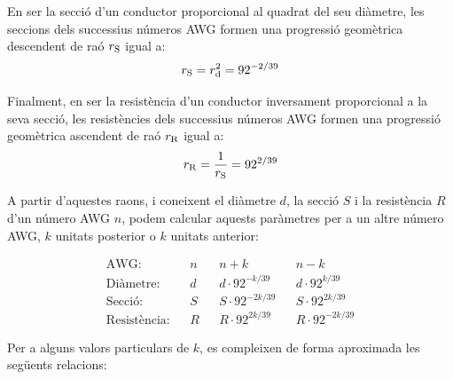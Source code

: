 En ser la secci\'{o} d'un conductor proporcional al quadrat del seu di\`{a}metre, les seccions dels successius n\'{u}meros AWG formen una progressi\'{o} geom\`{e}trica  descendent de ra\'{o} $r_\mathrm{S}$ igual a: \begin{equation}
   r_\mathrm{S} = r_\mathrm{d}^2 = 92^{-2/39}
\end{equation}

Finalment, en ser la resist\`{e}ncia d'un conductor inversament proporcional a la seva secci\'{o}, les resist\`{e}ncies dels successius n\'{u}meros AWG formen una progressi\'{o} geom\`{e}trica ascendent de ra\'{o} $r_\mathrm{R}$ igual a:
\begin{equation}
   r_\mathrm{R} = \frac{1}{r_\mathrm{S}} = 92^{2/39}
\end{equation}

A partir d'aquestes raons, i coneixent el di\`{a}metre $d$, la secci\'{o} $S$ i la resist\`{e}ncia $R$ d'un n\'{u}mero AWG $n$, podem calcular aquests par\`{a}metres per a un altre n\'{u}mero AWG, $k$ unitats posterior o $k$ unitats anterior:

\begin{equation}
   \begin{array}{rllllll}
     \text{AWG:}         & & n & & n+k                & & n-k \\
     \text{Di\`{a}metre:}    & & d & & d\cdot 92^{-k/39}  & & d\cdot 92^{k/39} \\
     \text{Secci\'{o}:}      & & S & & S\cdot 92^{-2k/39} & & S\cdot 92^{2k/39} \\
     \text{Resist\`{e}ncia:} & & R & & R\cdot 92^{2k/39}  & & R\cdot 92^{-2k/39}
   \end{array}
\end{equation}

Per a alguns valors particulars de $k$, es compleixen de forma aproximada les seg\"{u}ents relacions:

